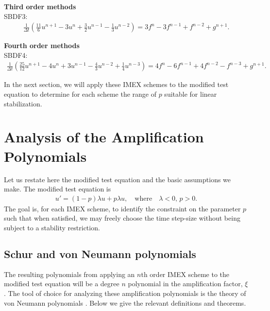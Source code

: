 \noindent
\textbf{Third order methods}\\
SBDF3:
\begin{align}
\frac{1}{\Delta t}\left(\frac{11}{6}u^{n+1} - 3u^n + \frac{3}{2}u^{n-1} - \frac{1}{3}u^{n-2} \right) 
= 3f^n - 3f^{n-1} + f^{n-2} + g^{n+1}.
\label{sbdf3}
\end{align}

\noindent
\textbf{Fourth order methods}\\
SBDF4:
\begin{align}
\frac{1}{\Delta t}\left(\frac{25}{12}u^{n+1} - 4u^n + 3u^{n-1} - \frac{4}{3}u^{n-2} + \frac{1}{4}u^{n-3} \right) 
= 4f^n - 6f^{n-1} + 4f^{n-2} -f^{n-3} + g^{n+1}.
\label{sbdf4}
\end{align}

In the next section, we will apply these IMEX schemes to the modified test equation to determine for each scheme the range of $p$ suitable for linear stabilization.

\section{Analysis of the Amplification Polynomials}
Let us restate here the modified test equation and the basic assumptions we make.
The modified test equation is 
\begin{align*}
        u' = (1-p)\lambda u + p\lambda u,
\quad\text{where}\quad \lambda < 0\text{, } p>0.
\label{mtee}
\end{align*}
The goal is, for each IMEX scheme, to identify the constraint on the parameter $p$ such that when satisfied, we may freely choose the time step-size without being subject to a stability restriction.

\subsection{Schur and von Neumann polynomials}
The resulting polynomials from applying an $n$th order IMEX scheme to the modified test equation will be a degree $n$ polynomial in the amplification factor, $\xi$. The tool of choice for analyzing these amplification polynomials is the theory of von Neumann polynomials \cite[Chapter 4]{strikwerda2004finite}. Below we give the relevant definitions and theorems.

